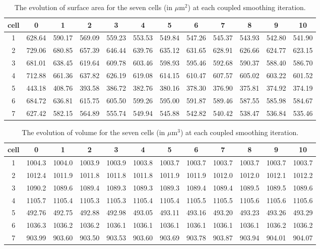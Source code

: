 \documentclass[10pt,letterpaper]{article}
\begin{document}
\begin{table}[h!]
\footnotesize
\begin{tabular}{|c|ccccccccccc|}
\hline
cell & 0 &1 &2 &3 &4 &5 &6 &7 &8 &9 &10\\
\hline
1 &628.64 &590.17 &569.09 &559.23 &553.53 &549.84 &547.26 &545.37 &543.93 &542.80 &541.90\\
2 &729.06 &680.85 &657.39 &646.44 &639.76 &635.12 &631.65 &628.91 &626.66 &624.77 &623.15\\
3 &681.01 &638.45 &619.64 &609.78 &603.46 &598.93 &595.46 &592.68 &590.37 &588.40 &586.70\\
4 &712.88 &661.36 &637.82 &626.19 &619.08 &614.15 &610.47 &607.57 &605.02 &603.22 &601.52\\
5 &443.18 &408.76 &393.58 &386.72 &382.76 &380.16 &378.30 &376.90 &375.81 &374.92 &374.19\\
6 &684.72 &636.81 &615.75 &605.50 &599.26 &595.00 &591.87 &589.46 &587.55 &585.98 &584.67\\
7 &627.42 &582.15 &564.89 &555.74 &549.94 &545.88 &542.82 &540.42 &538.47 &536.84 &535.46\\
\hline
\end{tabular}
\caption{The evolution of surface area for the seven cells (in $\mu \text{m}^2$)  at each coupled smoothing iteration.}
\end{table}

\begin{table}[h!]
\footnotesize
\begin{tabular}{|c|ccccccccccc|}
\hline
cell & 0 &1 &2 &3 &4 &5 &6 &7 &8 &9 &10\\
\hline
1 &1004.3 &1004.0 &1003.9 &1003.9 &1003.8 &1003.7 &1003.7 &1003.7 &1003.7 &1003.7 &1003.7\\
2 &1012.4 &1011.9 &1011.8 &1011.8 &1011.8 &1011.9 &1011.9 &1012.0 &1012.0 &1012.1 &1012.2\\
3 &1090.2 &1089.6 &1089.4 &1089.3 &1089.3 &1089.3 &1089.4 &1089.4 &1089.5 &1089.5 &1089.6\\
4 &1105.7 &1105.4 &1105.3 &1105.3 &1105.4 &1105.4 &1105.5 &1105.5 &1105.6 &1105.6 &1105.6\\
5 &492.76 &492.75 &492.88 &492.98 &493.05 &493.11 &493.16 &493.20 &493.23 &493.26 &493.29\\
6 &1036.3 &1036.2 &1036.2 &1036.1 &1036.1 &1036.1 &1036.1 &1036.1 &1036.1 &1036.2 &1036.2\\
7 &903.99 &903.60 &903.50 &903.53 &903.60 &903.69 &903.78 &903.87 &903.94 &904.01 &904.07\\
\hline
\end{tabular}
\caption{The evolution of volume for the seven cells (in $\mu \text{m}^3$)  at each coupled smoothing iteration.}
\end{table}
\end{document}
